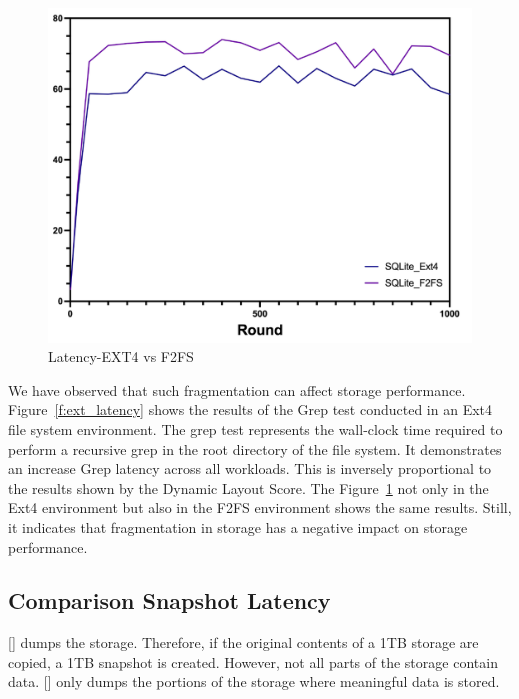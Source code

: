 \begin{figure}[t]
    \centering
	\includegraphics[width=0.95\columnwidth]{graphs/f2fs_vs_ext4_latency}
	\caption{Latency-EXT4 vs F2FS}
	\label{f:f2fs_vs_ext4_latency}
\end{figure}

We have observed that such fragmentation can affect storage performance.
Figure~\ref{f:ext_latency} shows the results of the Grep test conducted in an Ext4 file system environment.
The grep test represents the wall-clock time required to perform a recursive grep in the root directory of the file system.
It demonstrates an increase Grep latency across all workloads.
This is inversely proportional to the results shown by the Dynamic Layout Score.
The Figure~\ref{f:f2fs_vs_ext4_latency} not only in the Ext4 environment but also in the F2FS environment shows the same results.
Still, it indicates that fragmentation in storage has a negative impact on storage performance.

\subsection{Comparison Snapshot Latency}
[] dumps the storage.
Therefore, if the original contents of a 1TB storage are copied, a 1TB snapshot is created.
However, not all parts of the storage contain data.
[] only dumps the portions of the storage where meaningful data is stored.

